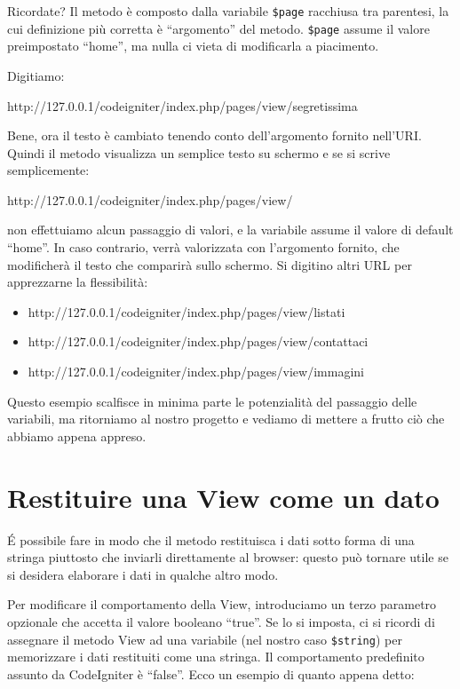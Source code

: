 Ricordate? Il metodo  è composto dalla variabile \verb|$page| racchiusa tra parentesi, la cui definizione più corretta è ``argomento'' del metodo. \verb|$page| assume il valore preimpostato ``home'', ma nulla ci vieta di modificarla a piacimento.

Digitiamo:

\begin{code}
http://127.0.0.1/codeigniter/index.php/pages/view/segretissima
\end{code}

Bene, ora il testo è cambiato tenendo conto dell'argomento  fornito nell'\ac{URI}. Quindi il metodo  visualizza un semplice testo su schermo e se si scrive semplicemente:

\begin{code}
http://127.0.0.1/codeigniter/index.php/pages/view/
\end{code}

non effettuiamo alcun passaggio di valori, e la variabile  assume il valore di default ``home''. In caso contrario, verrà valorizzata con l'argomento fornito, che modificherà il testo che comparirà sullo schermo. Si digitino altri \ac{URL} per apprezzarne la flessibilità:

\begin{itemize}
\item http://127.0.0.1/codeigniter/index.php/pages/view/listati
\item http://127.0.0.1/codeigniter/index.php/pages/view/contattaci
\item http://127.0.0.1/codeigniter/index.php/pages/view/immagini
\end{itemize}

Questo esempio scalfisce in minima parte le potenzialità del passaggio delle variabili, ma ritorniamo al nostro progetto e vediamo di mettere a frutto ciò che abbiamo appena appreso.

\section{Restituire una View come un dato}
\'E possibile fare in modo che il metodo restituisca i dati sotto forma di una stringa piuttosto che inviarli direttamente al browser: questo può tornare utile se si desidera elaborare i dati in qualche altro modo. 

Per modificare il comportamento della View, introduciamo un terzo parametro opzionale  che accetta il valore booleano ``true''. Se lo si imposta, ci si ricordi di assegnare il metodo View ad una variabile (nel nostro caso \verb|$string|) per memorizzare i dati restituiti come una stringa. Il comportamento predefinito assunto da CodeIgniter è ``false''. Ecco un esempio di quanto appena detto:

